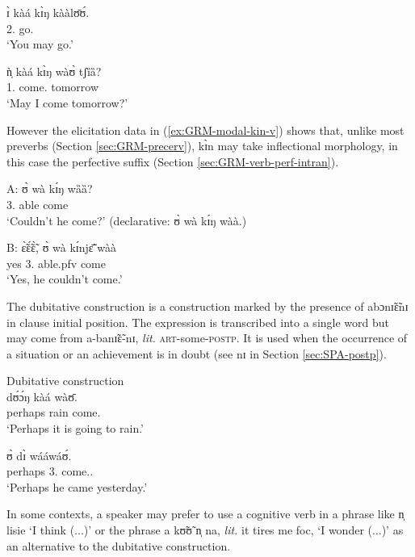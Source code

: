 \ex  
\gll ɪ̀ kàá kɪ̀ŋ kààlʊ̄ʊ́.\\
 {2.\sg} {\fut} {\abi} go.{\foc}\\
\glt  `You may go.'

\ex\label{ex:GRM-modal-13.1}
\gll ǹ̩ kàá kɪ̀ŋ wàʊ̀ tʃȉȁ?\\
 {1.\sg}  {\fut} {\abi} come.{\foc} tomorrow\\
\glt `May I come tomorrow?'

\z
\z

However  the elicitation data in (\ref{ex:GRM-modal-kin-v}) shows that, unlike most preverbs  (Section \ref{sec:GRM-precerv}), {\sls kɪ̀n}   may take inflectional morphology, in this case the perfective suffix (Section \ref{sec:GRM-verb-perf-intran}).  

\ea\label{ex:GRM-modal-kin-v}
\ea 
\gll A: ʊ̀ wà kɪ́ŋ wȁȁ?\\
{} {3.\sg} {\neg} {able} come \\
\glt  `Couldn't he come?' (declarative: {\sls ʊ̀ wà kɪ́ŋ wàà.})

\ex 
\gll  B: ɛ̃̀ɛ̃́ɛ̃̀, ʊ̀ wà kɪ́njɛ̃̄ wàà\\
{}  yes {3.\sg} {\neg} able.{\sc pfv} come\\
\glt  `Yes, he couldn't come.'

\z
\z

The dubitative  construction is a construction marked by the presence of  
{\sls abɔnɪ̃ɛ̃nɪ} in clause initial position.  The expression is transcribed into  a single word but may come from {\sls a-banɪ̃ɛ̃-nɪ}, {\it lit.} \textsc{art}-some-\textsc{postp}. It  is used when the occurrence of a 
situation  or an achievement  is in doubt (see {\sls nɪ} in Section \ref{sec:SPA-postp}).

\ea
\label{ex:GRM-modal}{\rm Dubitative construction}\\

\ea
\label{ex:GRM-modal-45.5}
  dʊ́ɔ́ŋ kàá wàʊ̄.\\
perhaps rain {\fut} come.{\foc}\\
\glt  `Perhaps it is going to rain.'


\ex
\label{ex:GRM-modal-45.3}
   ʊ̀ dɪ̀ wááwáʊ́.\\
perhaps  {3.\sg} {\hest} come.{\pfv.\foc}\\
\glt `Perhaps he came yesterday.'

\z
\z


In some contexts, a speaker may prefer  to use a cognitive verb in a phrase like {\sls n̩ lisie} `I think (...)'  or the phrase {\sls a kʊ̃ʊ̃ n̩ na}, {\it lit.} it tires me {\sc foc},  `I wonder (...)' as an alternative to the dubitative construction. 

